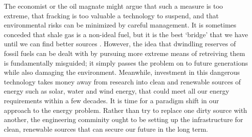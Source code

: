 \documentclass[12pt,letterpaper]{article}
\begin{document}
The economist or the oil magnate might argue that such a measure is too extreme, that fracking is too valuable a technology to suspend, and that environmental risks can be minimized by careful management. It is sometimes conceded that shale gas is a non-ideal fuel, but it is the best `bridge' that we have until we can find better sources \cite{bridge}. However, the idea that dwindling reserves of fossil fuels can be dealt with by pursuing more extreme means of retreiving them is fundamentally misguided; it simply passes the problem on to future generations while also damaging the environment. Meanwhile, investment in this dangerous technology takes money away from research into clean and renewable sources of energy such as solar, water and wind energy, that could meet all our energy requirements within a few decades\cite[58]{sciam}. It is time for a paradigm shift in our approach to the energy problem. Rather than try to replace one dirty source with another, the engineering comminity ought to be setting up the infrastructure for clean, renewable sources that can secure our future in the long term.


\makeworkscited
\end{document}
